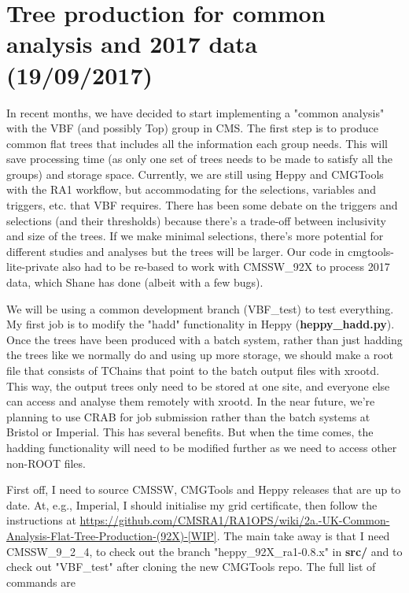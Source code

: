 \newpage
\chapter{Tree production for common analysis and 2017 data (19/09/2017)}

In recent months, we have decided to start implementing a "common analysis" with the VBF (and possibly Top) group in CMS. The first step is to produce common flat trees that includes all the information each group needs. This will save processing time (as only one set of trees needs to be made to satisfy all the groups) and storage space. Currently, we are still using Heppy and CMGTools with the RA1 workflow, but accommodating for the selections, variables and triggers, etc. that VBF requires. There has been some debate on the triggers and selections (and their thresholds) because there's a trade-off between inclusivity and size of the trees. If we make minimal selections, there's more potential for different studies and analyses but the trees will be larger. Our code in cmgtools-lite-private also had to be re-based to work with CMSSW\_92X to process 2017 data, which Shane has done (albeit with a few bugs).

We will be using a common development branch (VBF\_test) to test everything. My first job is to modify the "hadd" functionality in Heppy (\textbf{heppy\_hadd.py}). Once the trees have been produced with a batch system, rather than just hadding the trees like we normally do and using up more storage, we should make a root file that consists of TChains that point to the batch output files with xrootd. This way, the output trees only need to be stored at one site, and everyone else can access and analyse them remotely with xrootd. In the near future, we're planning to use CRAB for job submission rather than the batch systems at Bristol or Imperial. This has several benefits. But when the time comes, the hadding functionality will need to be modified further as we need to access other non-ROOT files.

First off, I need to source CMSSW, CMGTools and Heppy releases that are up to date. At, e.g., Imperial, I should initialise my grid certificate, then follow the instructions at \url{https://github.com/CMSRA1/RA1OPS/wiki/2a.-UK-Common-Analysis-Flat-Tree-Production-(92X)-[WIP]}. The main take away is that I need CMSSW\_9\_2\_4, to check out the branch "heppy\_92X\_ra1-0.8.x" in \textbf{src/} and to check out "VBF\_test" after cloning the new CMGTools repo. The full list of commands are

